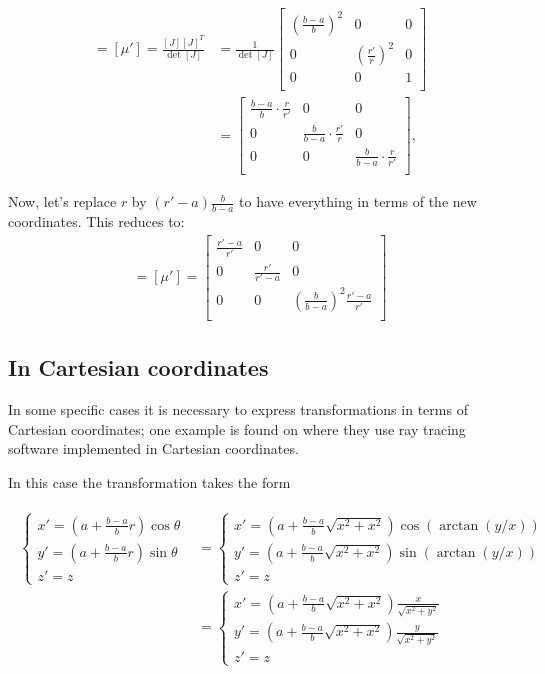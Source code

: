 \documentclass{amsart}
\begin{document}
\begin{align*}
  [\varepsilon'] =[\mu']= \frac{[J][J]^T}{\det[J]}&=\frac{1}{\det[J]}
  \begin{bmatrix}
    \left(\frac{b-a}{b}\right)^2  & 0 & 0\\
    0 & \left(\frac{r'}{r}\right)^2 & 0\\
    0 & 0 & 1\\
  \end{bmatrix}\\
  &=
  \begin{bmatrix}
    \frac{b-a}{b}\cdot\frac{r}{r'}  & 0 & 0\\
    0 & \frac{b}{b-a}\cdot\frac{r'}{r} & 0\\
    0 & 0 & \frac{b}{b-a}\cdot\frac{r}{r'}\\
  \end{bmatrix},
\end{align*}

Now, let's replace \(r\) by \((r'-a)\frac{b}{b-a}\) to have everything
in terms of the new coordinates. This reduces to:
\begin{align}
  [\varepsilon'] =[\mu']=\begin{bmatrix}
    \frac{r'-a}{r'} & 0 & 0\\
    0 & \frac{r'}{r'-a} & 0\\
    0 & 0 & \left(\frac{b}{b-a}\right)^2\frac{r'-a}{r'}\\
  \end{bmatrix}
\end{align}

\subsection{In Cartesian coordinates}
In some specific cases it is necessary to express transformations in terms of Cartesian coordinates;
one example is found on \cite{Schurig06_ray} where they use ray tracing software implemented in Cartesian coordinates.

In this case the transformation takes the form

\begin{align}\label{transformationCartesian}
\begin{split}
\begin{cases}
x'=(a+\frac{b-a}{b}r)\cos\theta\\
y'=(a+\frac{b-a}{b}r)\sin\theta\\
z'=z
\end{cases}
&=
\begin{cases}
x'=(a+\frac{b-a}{b}\sqrt{x^2+x^2})\cos(\arctan(y/x))\\
y'=(a+\frac{b-a}{b}\sqrt{x^2+x^2})\sin(\arctan(y/x))\\
z'=z
\end{cases}\\
&=
\begin{cases}
  x'=\left(a+\frac{b-a}{b}\sqrt{x^2+x^2}\right)\frac{x}{\sqrt{x^2+y^2}}\\
y'=\left(a+\frac{b-a}{b}\sqrt{x^2+x^2}\right)\frac{y}{\sqrt{x^2+y^2}}\\
z'=z
\end{cases}
\end{split}
\end{align}
\end{document}

